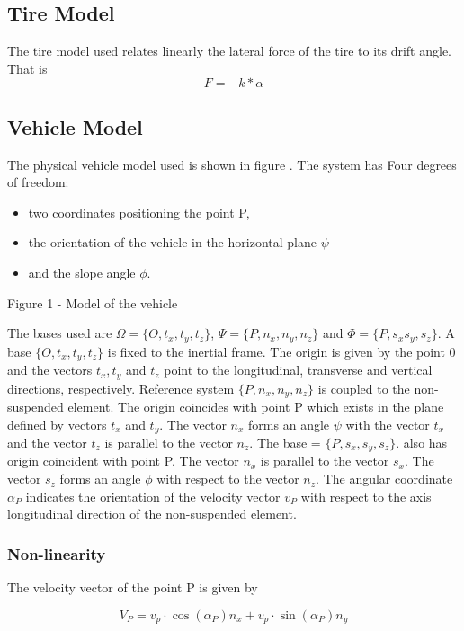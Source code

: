 \documentclass[sublist,a4paper,twoside,11pt]{article}
\begin{document}
\subsection{Tire Model}
The tire model used relates linearly the lateral force of the tire to its drift angle. That is
\[ F=-k*\alpha\]

\subsection{Vehicle Model}
The physical vehicle model used is shown in figure . The system has Four degrees of freedom: 
\begin{itemize}
\item two coordinates positioning the point P, 
\item the orientation of the vehicle in the horizontal plane $\psi$ 
\item and the slope angle $\phi$.
\end{itemize}
	
	Figure 1 - Model of the vehicle
	
	
The bases used are $\Omega = \{O,t_x, t_y, t_z \}$, $\Psi = \{P, n_x, n_y, n_z \}$ and $\Phi = \{P,s_x s_y,s_z\}$. A base $\{O,t_x, t_y,t_z \}$ is fixed to the inertial frame. The origin is given by the point 0 and the vectors $t_x, t_y$ and $t_z$ point to the longitudinal, transverse and vertical directions, respectively. Reference system $\{P, n_x, n_y, n_z\}$ is coupled to the non-suspended element. The origin coincides with point P which exists in the plane defined by vectors $t_x$ and $t_y$. The vector $n_x$ forms an angle $\psi$ with the vector $t_x$ and the vector $t_z$ is parallel to the vector $n_z$. The base = $\{P,s_x, s_y,s_z\}$. also has origin coincident with point P. The vector $n_x$ is parallel to the vector $s_x$. The vector $s_z$ forms an angle $\phi$ with respect to the vector $n_z$. The angular coordinate $\alpha_P$ indicates the orientation of the velocity vector $v_P$ with respect to the axis longitudinal direction of the non-suspended element.
	
\subsubsection{Non-linearity}

The velocity vector of the point P is given by

\begin{equation}
V_P = v_p\cdot \cos(\alpha_P) n_x + v_p\cdot \sin(\alpha_P ) n_y
\end{equation}
\end{document}

